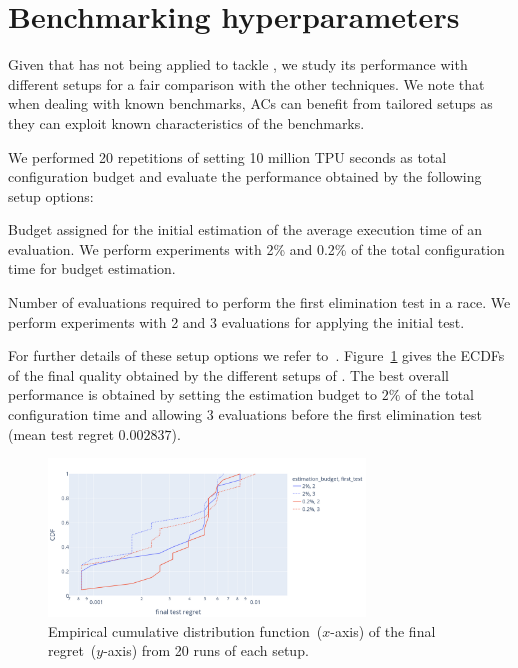 \section{Benchmarking \irace hyperparameters}
Given that \irace has not being applied to tackle \nasbench, we study its performance with different setups for a fair comparison with the other \nasbench techniques. We note that when dealing with known benchmarks, ACs can benefit from tailored setups as they can exploit known characteristics of the benchmarks.


We performed 20 repetitions of \irace setting 10 million TPU seconds as total configuration budget and evaluate the performance obtained by the following setup options:

\begin{description}[style=unboxed, leftmargin=0px]
\item[Estimation budget] Budget assigned for the initial estimation of the average execution time of an evaluation. We perform experiments with 2\% and 0.2\% of the total configuration time for budget estimation.
\item[First test] Number of evaluations required to perform the first elimination test in a race. We perform experiments with 2 and 3 evaluations for applying the initial test.
\end{description}

For further details of these setup options we refer to~\cite{LopDubPerStuBir2016irace}. Figure~\ref{fig:irace-setup-performance} gives the ECDFs of the final quality obtained by the different setups of \irace. The best overall performance is obtained by setting the estimation budget to $2\%$ of the total configuration time and allowing 3 evaluations before the first elimination test (mean test regret $0.002837$).
\begin{figure}
	\centering
	\includegraphics[width=0.75\textwidth, clip=true, trim=30px 40px 10px 40px]{imgs/irace-setup-ecdf.png}
	\caption{Empirical cumulative distribution function~($x$-axis) of the final regret~($y$-axis) from 20 runs of each \irace setup.}
	\label{fig:irace-setup-performance}
\end{figure}

